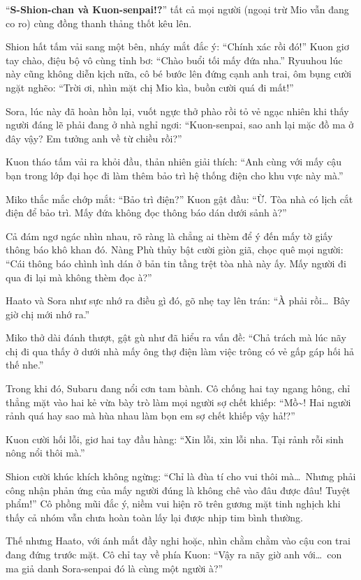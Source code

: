 \documentclass[../main.tex]{subfiles}
\begin{document}
``\textbf{S-Shion-chan và Kuon-senpai!?}'' tất cả mọi người (ngoại trừ Mio vẫn đang co ro) cùng đồng thanh thảng thốt kêu lên.

Shion hất tấm vải sang một bên, nháy mắt đắc ý: ``Chính xác rồi đó!''
Kuon giơ tay chào, điệu bộ vô cùng tỉnh bơ: ``Chào buổi tối mấy đứa nha.''
Ryuuhou lúc này cũng không diễn kịch nữa, cô bé bước lên đứng cạnh anh trai, ôm bụng cười ngặt nghẽo: ``Trời ơi, nhìn mặt chị Mio kìa, buồn cười quá đi mất!''

Sora, lúc này đã hoàn hồn lại, vuốt ngực thở phào rồi tỏ vẻ ngạc nhiên khi thấy người đáng lẽ phải đang ở nhà nghỉ ngơi: ``Kuon-senpai, sao anh lại mặc đồ ma ở đây vậy? Em tưởng anh về từ chiều rồi?''

Kuon tháo tấm vải ra khỏi đầu, thản nhiên giải thích: ``Anh cùng với mấy cậu bạn trong lớp đại học đi làm thêm bảo trì hệ thống điện cho khu vực này mà.''

Miko thắc mắc chớp mắt: ``Bảo trì điện?'' Kuon gật đầu: ``Ừ. Tòa nhà có lịch cắt điện để bảo trì. Mấy đứa không đọc thông báo dán dưới sảnh à?''

Cả đám ngơ ngác nhìn nhau, rõ ràng là chẳng ai thèm để ý đến mấy tờ giấy thông báo khô khan đó. Nàng Phù thủy bật cười giòn giã, chọc quê mọi người: ``Cái thông báo chình ình dán ở bản tin tầng trệt tòa nhà này ấy. Mấy người đi qua đi lại mà không thèm đọc à?''

Haato và Sora như sực nhớ ra điều gì đó, gõ nhẹ tay lên trán: ``À phải rồi\dots\ Bây giờ chị mới nhớ ra.''

Miko thở dài đánh thượt, gật gù như đã hiểu ra vấn đề: ``Chả trách mà lúc nãy chị đi qua thấy ở dưới nhà mấy ông thợ điện làm việc trông có vẻ gấp gáp hối hả thế nhe.''

Trong khi đó, Subaru đang nổi cơn tam bành. Cô chống hai tay ngang hông, chỉ thẳng mặt vào hai kẻ vừa bày trò làm mọi người sợ chết khiếp: ``Mồ\~{}! Hai người rảnh quá hay sao mà hùa nhau làm bọn em sợ chết khiếp vậy hả!?''

Kuon cười hối lỗi, giơ hai tay đầu hàng: ``Xin lỗi, xin lỗi nha. Tại rảnh rỗi sinh nông nổi thôi mà.''

Shion cười khúc khích không ngừng: ``Chỉ là đùa tí cho vui thôi mà\dots\ Nhưng phải công nhận phản ứng của mấy người đúng là không chê vào đâu được đâu! Tuyệt phẩm!'' Cô phồng mũi đắc ý, niềm vui hiện rõ trên gương mặt tinh nghịch khi thấy cả nhóm vẫn chưa hoàn toàn lấy lại được nhịp tim bình thường.

Thế nhưng Haato, với ánh mắt đầy nghi hoặc, nhìn chằm chằm vào cậu con trai đang đứng trước mặt. Cô chỉ tay về phía Kuon: ``Vậy ra nãy giờ anh với\dots\ con ma giả danh Sora-senpai đó là cùng một người à?''
\end{document}
